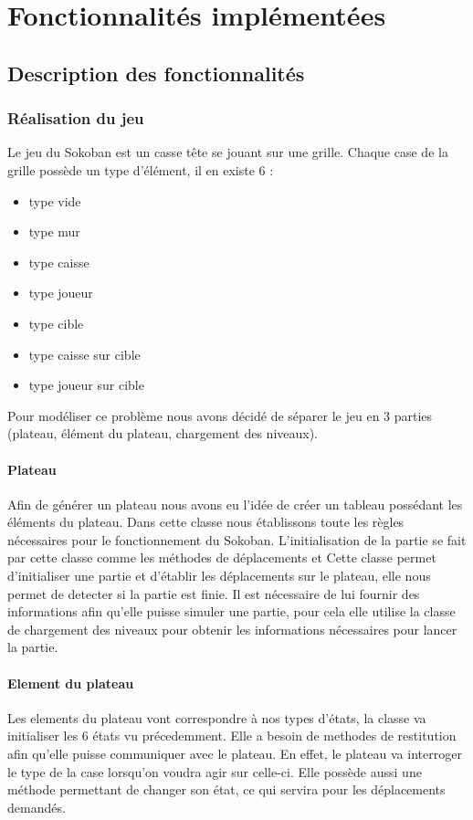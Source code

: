 \documentclass[a4paper, 11pt]{report}
\begin{document}
\chapter{Fonctionnalités implémentées}

\section{Description des fonctionnalités}

\subsection{Réalisation du jeu}
Le jeu du Sokoban est un casse tête se jouant sur une grille. Chaque case de la grille possède un type d'élément, il en existe 6 :
\begin{itemize}
    \item type vide
    \item type mur
    \item type caisse
    \item type joueur
    \item type cible
    \item type caisse sur cible
    \item type joueur sur cible
\end{itemize}
Pour modéliser ce problème nous avons décidé de séparer le jeu en 3 parties (plateau, élément du plateau, chargement des niveaux).

\subsubsection{Plateau}
Afin de générer un plateau nous avons eu l'idée de créer un tableau possédant les éléments du plateau. Dans cette classe nous établissons toute les règles nécessaires pour le fonctionnement du Sokoban. L'initialisation de la partie se fait par cette classe comme les méthodes de déplacements et 
Cette classe permet d'initialiser une partie et d'établir les déplacements sur le plateau, elle nous permet de detecter si la partie est finie.
Il est nécessaire de lui fournir des informations afin qu'elle puisse simuler une partie, pour cela elle utilise la classe de chargement des niveaux pour obtenir les informations nécessaires pour lancer la partie.

\subsubsection{Element du plateau}
Les elements du plateau vont correspondre à nos types d'états, la classe va initialiser les 6 états vu précedemment. Elle a besoin de methodes de restitution afin qu'elle puisse communiquer avec le plateau. En effet, le plateau va interroger le type de la case lorsqu'on voudra agir sur celle-ci. Elle possède aussi une méthode permettant de changer son état, ce qui servira pour les déplacements demandés.\\
\end{document}

